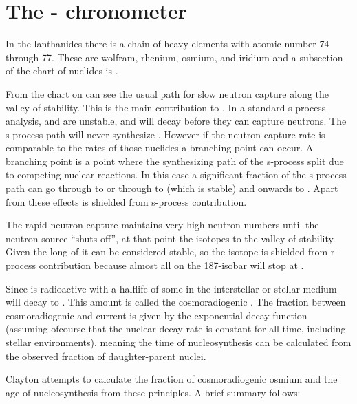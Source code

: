 \section{The - chronometer\cite{clayton64a}}

In the lanthanides there is a chain of heavy elements with atomic number 74 through 77.
These are wolfram, rhenium, osmium, and iridium and a subsection of the chart of nuclides is .


From the chart on can see the usual path for slow neutron capture along the valley of stability.
This is the main contribution to . In a standard s-process analysis,  and  are unstable, and will decay before they can capture neutrons. The s-process path will never synthesize . However if the neutron capture rate is comparable to the \betadecay rates of those nuclides a branching point can occur. A branching point is a point where the synthesizing path of the s-process split due to competing nuclear reactions. In this case a significant fraction of the s-process path can go through  to  or through  to  (which is stable) and onwards to . Apart from these effects  is shielded from s-process contribution.

The rapid neutron capture maintains very high neutron numbers until the neutron source ``shuts off'', at that point the isotopes \betadecay to the valley of stability. Given the long \halflife of  it can be considered stable, so the  isotope is shielded from r-process contribution because almost all \betadecay on the 187-isobar will stop at .

Since  is radioactive with a halflife of  some  in the interstellar or stellar medium will decay to . This amount is called the cosmoradiogenic . The fraction between cosmoradiogenic  and current  is given by the exponential decay-function (assuming ofcourse that the nuclear decay rate is constant for all time, including stellar environments), meaning the time of nucleosynthesis can be calculated from the observed fraction of daughter-parent nuclei.

Clayton\cite{clayton64a} attempts to calculate the fraction of cosmoradiogenic osmium and the age of nucleosynthesis from these principles.
A brief summary follows:

